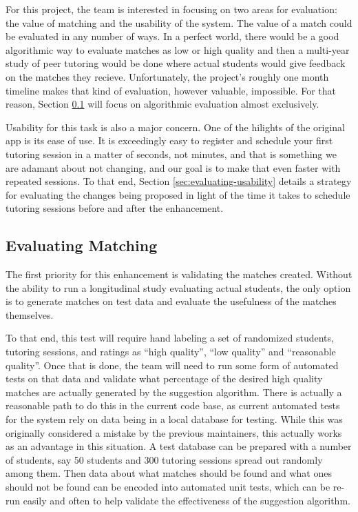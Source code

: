 For this project, the team is interested in focusing on two areas for
evaluation: the value of matching and the usability of the system.
The value of a match could be evaluated in any number of ways.  In a
perfect world, there would be a good algorithmic way to evaluate
matches as low or high quality and then a multi-year study of peer
tutoring would be done where actual students would give feedback on
the matches they recieve.  Unfortunately, the project's roughly one
month timeline makes that kind of evaluation, however valuable,
impossible.  For that reason, Section \ref{sec:evaluating-matching}
will focus on algorithmic evaluation almost exclusively.

Usability for this task is also a major concern.  One of the hilights
of the original app is its ease of use.  It is exceedingly easy to
register and schedule your first tutoring session in a matter of
seconds, not minutes, and that is something we are adamant about not
changing, and our goal is to make that even faster with repeated
sessions.  To that end, Section \ref{sec:evaluating-usability} details
a strategy for evaluating the changes being proposed in light of the
time it takes to schedule tutoring sessions before and after the enhancement.


\subsection{Evaluating Matching}
\label{sec:evaluating-matching}
The first priority for this enhancement is validating the matches
created.  Without the ability to run a longitudinal study evaluating
actual students, the only option is to generate matches on test data
and evaluate the usefulness of the matches themselves.

To that end, this test will require hand labeling a set of randomized
students, tutoring sessions, and ratings as ``high quality'', ``low
quality'' and ``reasonable quality''.  Once that is done, the team
will need to run some form of automated tests on that data and
validate what percentage of the desired high quality matches are
actually generated by the suggestion algorithm.  There is actually a
reasonable path to do this in the current code base, as current
automated tests for the system rely on data being in a local database
for testing.  While this was originally considered a mistake by the
previous maintainers, this actually works as an advantage in this
situation.  A test database can be prepared with a number of students,
say 50 students and 300 tutoring sessions spread out randomly among
them.  Then data about what matches should be found and what ones
should not be found can be encoded into automated unit tests, which
can be re-run easily and often to help validate the effectiveness of
the suggestion algorithm.


